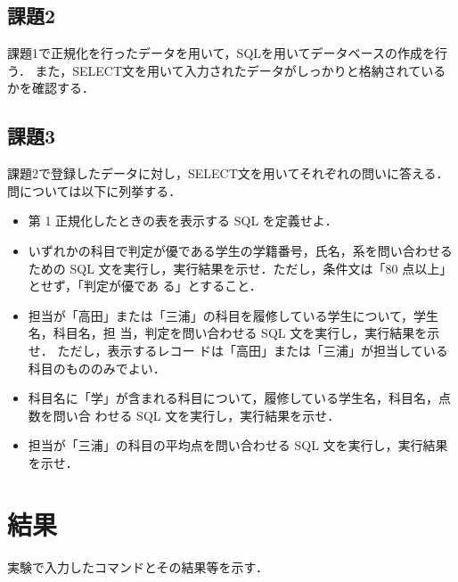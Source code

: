 \documentclass[a4paper,11pt]{ltjsarticle}
\begin{document}
\subsection{課題2}
課題1で正規化を行ったデータを用いて，SQLを用いてデータベースの作成を行う．
また，SELECT文を用いて入力されたデータがしっかりと格納されているかを確認する．
\subsection{課題3}
課題2で登録したデータに対し，SELECT文を用いてそれぞれの問いに答える．
問については以下に列挙する．
\begin{itemize}
  \item 第 1 正規化したときの表を表示する SQL を定義せよ．
  \item いずれかの科目で判定が優である学生の学籍番号，氏名，系を問い合わせるための SQL
        文を実行し，実行結果を示せ．ただし，条件文は「80 点以上」とせず，「判定が優であ
        る」とすること．
  \item 担当が「高田」または「三浦」の科目を履修している学生について，学生名，科目名，担
        当，判定を問い合わせる SQL 文を実行し，実行結果を示せ． ただし，表示するレコー
        ドは「高田」または「三浦」が担当している科目のもののみでよい．
  \item 科目名に「学」が含まれる科目について，履修している学生名，科目名，点数を問い合
        わせる SQL 文を実行し，実行結果を示せ．
  \item 担当が「三浦」の科目の平均点を問い合わせる SQL 文を実行し，実行結果を示せ．
\end{itemize}
\section{結果}
実験で入力したコマンドとその結果等を示す．
\end{document}
